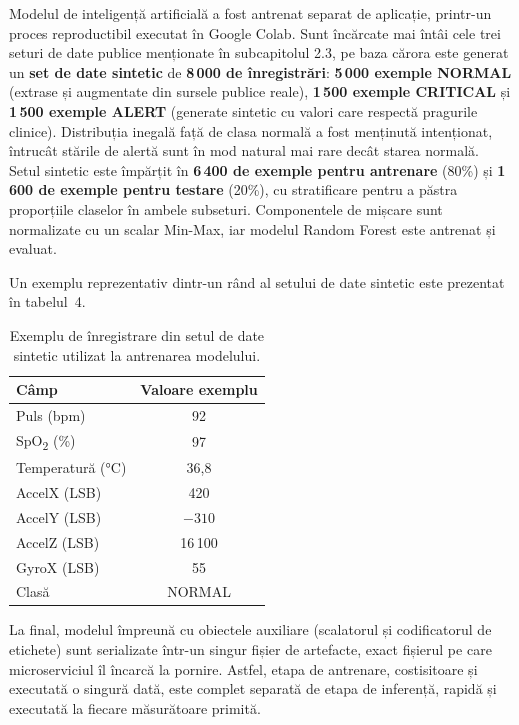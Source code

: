\documentclass[12pt,a4paper,twoside]{article}
\begin{document}
Modelul de inteligență artificială a fost antrenat separat de aplicație, printr-un proces reproductibil executat în Google Colab. Sunt încărcate mai întâi cele trei seturi de date publice menționate în subcapitolul 2.3, pe baza cărora este generat un \textbf{set de date sintetic} de \textbf{8\,000 de înregistrări}: \textbf{5\,000 exemple NORMAL} (extrase și augmentate din sursele publice reale), \textbf{1\,500 exemple CRITICAL} și \textbf{1\,500 exemple ALERT} (generate sintetic cu valori care respectă pragurile clinice). Distribuția inegală față de clasa normală a fost menținută intenționat, întrucât stările de alertă sunt în mod natural mai rare decât starea normală. Setul sintetic este împărțit în \textbf{6\,400 de exemple pentru antrenare} (80\%) și \textbf{1\,600 de exemple pentru testare} (20\%), cu stratificare pentru a păstra proporțiile claselor în ambele subseturi. Componentele de mișcare sunt normalizate cu un scalar Min-Max, iar modelul Random Forest este antrenat și evaluat.

Un exemplu reprezentativ dintr-un rând al setului de date sintetic este prezentat în tabelul~4.

\begin{table}[H]
\centering
\small
\renewcommand{\arraystretch}{1.2}
\begin{tabular}{|l|c|}
\hline
\textbf{Câmp} & \textbf{Valoare exemplu}\\
\hline
Puls (bpm) & 92\\
\hline
SpO\textsubscript{2} (\%) & 97\\
\hline
Temperatură (°C) & 36,8\\
\hline
AccelX (LSB) & 420\\
\hline
AccelY (LSB) & $-310$\\
\hline
AccelZ (LSB) & 16\,100\\
\hline
GyroX (LSB) & 55\\
\hline
Clasă & NORMAL\\
\hline
\end{tabular}
\caption{Exemplu de înregistrare din setul de date sintetic utilizat la antrenarea modelului.}
\label{tab:data-example}
\end{table}

La final, modelul împreună cu obiectele auxiliare (scalatorul și codificatorul de etichete) sunt serializate într-un singur fișier de artefacte, exact fișierul pe care microserviciul îl încarcă la pornire. Astfel, etapa de antrenare, costisitoare și executată o singură dată, este complet separată de etapa de inferență, rapidă și executată la fiecare măsurătoare primită.
\end{document}
